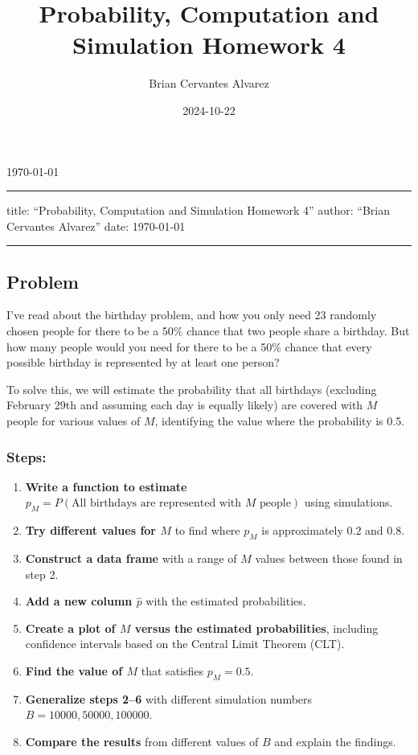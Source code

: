 \documentclass[
  letterpaper,
  DIV=11,
  numbers=noendperiod]{scrartcl}
\title{Probability, Computation and Simulation Homework 4}
\author{Brian Cervantes Alvarez}
\date{2024-10-22}
\makeatletter
\renewcommand{\maketitle}{
    \bgroup
    \begin{flushleft}
        \begin{spacing}{1.25}
        {\sffamily\fontsize{25}{20}\textbf{\capitalisewords{\@title}}} \vspace{0.3cm} \newline
        {\large\@author} \newline
        {\large\today} \newline %
        {\large {\@subtitle}} \vspace{-1cm}
        \end{spacing} %
    \end{flushleft}
    \egroup
}
\makeatother
\begin{document}
\maketitle

\pagestyle{mystyle}


\begin{center}\rule{0.5\linewidth}{0.5pt}\end{center}

title: ``Probability, Computation and Simulation Homework 4'' author:
``Brian Cervantes Alvarez'' date: \today

\begin{center}\rule{0.5\linewidth}{0.5pt}\end{center}

\subsection{Problem}\label{problem}

I've read about the birthday problem, and how you only need 23 randomly
chosen people for there to be a 50\% chance that two people share a
birthday. But how many people would you need for there to be a 50\%
chance that every possible birthday is represented by at least one
person?

To solve this, we will estimate the probability that all birthdays
(excluding February 29th and assuming each day is equally likely) are
covered with \(M\) people for various values of \(M\), identifying the
value where the probability is 0.5.

\subsubsection{Steps:}\label{steps}

\begin{enumerate}
\def\labelenumi{\arabic{enumi}.}
\item
  \textbf{Write a function to estimate
  \(p_M = P(\text{All birthdays are represented with } M \text{ people})\)}
  using simulations.
\item
  \textbf{Try different values for \(M\)} to find where \(p_M\) is
  approximately 0.2 and 0.8.
\item
  \textbf{Construct a data frame} with a range of \(M\) values between
  those found in step 2.
\item
  \textbf{Add a new column \(\hat{p}\)} with the estimated
  probabilities.
\item
  \textbf{Create a plot of \(M\) versus the estimated probabilities},
  including confidence intervals based on the Central Limit Theorem
  (CLT).
\item
  \textbf{Find the value of \(M\)} that satisfies \(p_M = 0.5\).
\item
  \textbf{Generalize steps 2--6} with different simulation numbers
  \(B = 10000, 50000, 100000\).
\item
  \textbf{Compare the results} from different values of \(B\) and
  explain the findings.
\end{enumerate}
\end{document}
